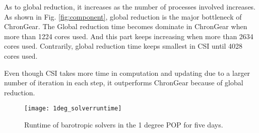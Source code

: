 \documentclass{sig-alternate}
\begin{document}
As to global reduction, it increases as the number of processes involved increases. As shown in Fig. \ref{fig:component}, global reduction is the major bottleneck of ChronGear. 
The Global reduction time becomes dominate in ChronGear when more than 1224 cores used. And this part keeps increasing when more than 2634 cores used. Contrarily, global reduction time keeps smallest in CSI until 4028 cores used. 

Even though CSI takes more time in computation and updating due to a larger number of iteration in each step, it outperforms ChronGear because of global reduction.



%

\begin {figure}
\centering
\texttt{[image: 1deg\_solverruntime]}
\caption []{Runtime of barotropic solvers in the 1 degree POP for five days.\label {fig:runtime1}}
\end {figure}
\end{document}
